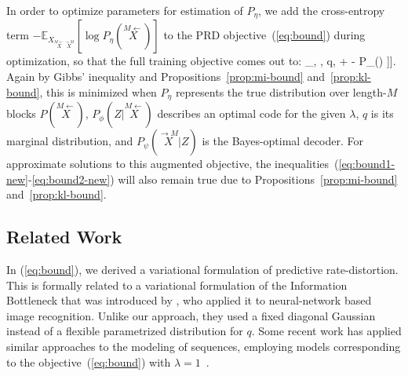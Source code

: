 \documentclass[entropy,article,submit,moreauthors,pdftex,10pt,a4paper]{Definitions/mdpi}
\newif \ifcomment
\newcommand\rljf[1]{\ifcomment{{\color{blue}(#1)}}\else{}\fi}
\newcommand{\finitefuture}{\stackrel{\rightarrow \scriptscriptstyle{M}}{X}}
\newcommand{\finitepast}{\stackrel{\scriptscriptstyle{M}\leftarrow}{X}}%
\let\oldequation\equation
\let\oldendequation\endequation
\renewenvironment{equation}
  {\linenomathNonumbers\oldequation}
  {\oldendequation\endlinenomath}
\begin{document}
In order to optimize parameters for estimation of $P_\eta$, we add the cross-entropy term $- \mathbb{E}_{X_{\finitepast\finitefuture}}\left[\log P_\eta(\finitepast)\right]$ to the PRD objective~(\ref{eq:bound}) during optimization, %
so that the full training objective comes out to:
\begin{equation}\label{eq:bound-augmented}
	\min_{\phi, \psi, q,\eta} \left[\mathbb{E}_{\finitepast, \finitefuture} \left[ -	\mathbb{E}_{Z \sim \phi(\finitepast)}\left[\log P_\psi(\finitefuture | Z)\right] + \lambda \cdot {} \left[ \infdivx{P_\phi(Z|\finitepast)}{q(Z)}\right] - \log P_\eta(\finitepast) \right]\right].
\end{equation} %
Again by Gibbs' inequality and Propositions~\ref{prop:mi-bound} and~\ref{prop:kl-bound}, this is minimized when $P_\eta$ represents the true distribution over length-$M$ blocks $P(\finitepast)$, $P_\phi(Z|\finitepast)$ describes an optimal code for the given $\lambda$, $q$ is its marginal distribution, and $P_\psi(\finitefuture|Z)$ is the Bayes-optimal decoder.
For approximate solutions to this augmented objective, the inequalities~(\ref{eq:bound1-new}-\ref{eq:bound2-new}) will also remain true due to Propositions~\ref{prop:mi-bound} and~\ref{prop:kl-bound}.







\subsection{Related Work}
In (\ref{eq:bound}), we derived a variational formulation of predictive rate-distortion.
This is formally related to a variational formulation of the Information Bottleneck that was introduced by \cite{alemi-deep-2016}, who applied it to neural-network based image recognition.
Unlike our approach, they used a fixed diagonal Gaussian instead of a flexible parametrized distribution for $q$.
Some recent work has applied similar approaches to the modeling of sequences, employing models corresponding to the objective~(\ref{eq:bound}) with $\lambda=1$~\citep{grathwohl2016disentangling,walker2016uncertain,fraccaro2017disentangled,hernandez2018variational}.
\end{document}
